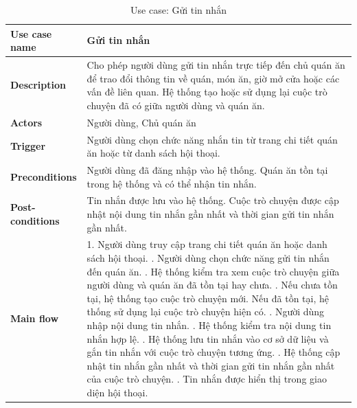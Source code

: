 \begin{longtable}{|p{4cm}|p{10cm}|}
\caption{Use case: Gửi tin nhắn}
\label{tab:usecase-send-message} \\

\endfirsthead

\endhead

\endfoot

\endlastfoot

\hline
\textbf{Use case name} &
Gửi tin nhắn \\
\hline

\textbf{Description} &
Cho phép người dùng gửi tin nhắn trực tiếp đến chủ quán ăn để trao đổi thông tin về quán, món ăn, giờ mở cửa hoặc các vấn đề liên quan. Hệ thống tạo hoặc sử dụng lại cuộc trò chuyện đã có giữa người dùng và quán ăn. \\
\hline

\textbf{Actors} &
Người dùng, Chủ quán ăn \\
\hline

\textbf{Trigger} &
Người dùng chọn chức năng nhắn tin từ trang chi tiết quán ăn hoặc từ danh sách hội thoại. \\
\hline

\textbf{Preconditions} &
Người dùng đã đăng nhập vào hệ thống. Quán ăn tồn tại trong hệ thống và có thể nhận tin nhắn. \\
\hline

\textbf{Post-conditions} &
Tin nhắn được lưu vào hệ thống. Cuộc trò chuyện được cập nhật nội dung tin nhắn gần nhất và thời gian gửi tin nhắn gần nhất. \\
\hline

\textbf{Main flow} &
1. Người dùng truy cập trang chi tiết quán ăn hoặc danh sách hội thoại. \newline
2. Người dùng chọn chức năng gửi tin nhắn đến quán ăn. \newline
3. Hệ thống kiểm tra xem cuộc trò chuyện giữa người dùng và quán ăn đã tồn tại hay chưa. \newline
4. Nếu chưa tồn tại, hệ thống tạo cuộc trò chuyện mới. Nếu đã tồn tại, hệ thống sử dụng lại cuộc trò chuyện hiện có. \newline
5. Người dùng nhập nội dung tin nhắn. \newline
6. Hệ thống kiểm tra nội dung tin nhắn hợp lệ. \newline
7. Hệ thống lưu tin nhắn vào cơ sở dữ liệu và gắn tin nhắn với cuộc trò chuyện tương ứng. \newline
8. Hệ thống cập nhật tin nhắn gần nhất và thời gian gửi tin nhắn gần nhất của cuộc trò chuyện. \newline
9. Tin nhắn được hiển thị trong giao diện hội thoại. \\
\hline


\end{longtable}
